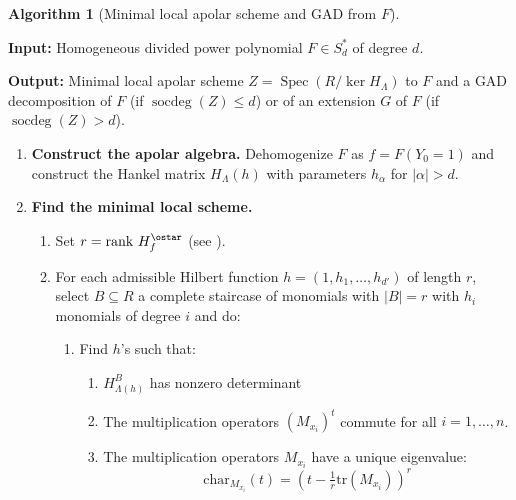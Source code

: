 \documentclass[a4paper,11p]{amsart}
\newtheorem{alg}{Algorithm}
\begin{document}
\vspace{0.5cm}
\begin{mdframed}[]
\begin{alg}[Minimal local apolar scheme and GAD from $F$]\label{alg:GlobalGAD}
\end{alg}
\vspace{0.1cm}
\noindent\textbf{Input:}  
Homogeneous divided power polynomial $F \in S_d^*$ of degree $d$.

\noindent\textbf{Output:}  
Minimal local apolar scheme $Z = \operatorname{Spec}(R/\ker H_\Lambda)$ to $F$ and a GAD decomposition of $F$ (if $\operatorname{socdeg}(Z) \le d$) or of an extension $G$ of $F$ (if $\operatorname{socdeg}(Z) > d$).

\begin{enumerate}
    \item \textbf{Construct the apolar algebra.}  
    Dehomogenize $F$ as $f = F(Y_0=1)$ and construct the Hankel matrix $H_\Lambda(h)$ with parameters $h_\alpha$ for $|\alpha|>d$.

    \item \textbf{Find the minimal local scheme.}

        \begin{enumerate}
            
        \item\label{alg:local:CHStar} Set $r=\text{rank } H_f^{\ostar}$ (see ).

    \item\label{Step3} For each admissible Hilbert function $ h = (1,h_1,\dots,h_{d'}) $ of length $ r $, select $B\subseteq R$ a complete staircase of monomials with $|B|=r$ with $h_i$ monomials of degree $i$ and do: 
    \begin{enumerate}
     
        \item\label{alg:localC:h's} Find $h$'s such that:
        \begin{enumerate}
            
            \item $H_{\Lambda(h)}^B$ has nonzero determinant
            \item The multiplication operators $(M_{x_i})^t$ commute for all $i=1,\ldots,n$.
            \item The multiplication operators $M_{x_i}$ have a unique eigenvalue: 
            \[
            \text{char}_{M_{x_i}}(t) = (t - \tfrac{1}{r} \mathrm{tr}(M_{x_i}))^r \]
            

\end{enumerate}
\end{enumerate}
\end{enumerate}
\end{enumerate}
\end{mdframed}
\end{document}
